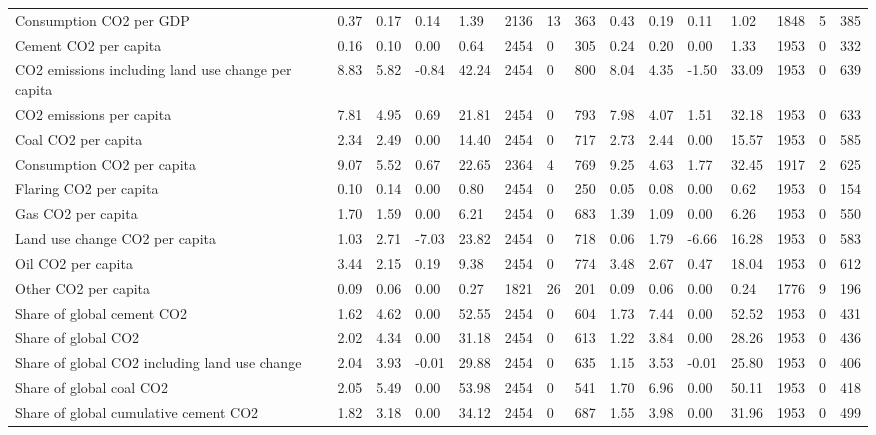 \begin{longtable}{lllllllllllllll}
\addlinespace
Consumption CO2 per GDP & 0.37 & 0.17 & 0.14 & 1.39 & 2136 & 13 & 363 & 0.43 & 0.19 & 0.11 & 1.02 & 1848 & 5 & 385\\
Cement CO2 per capita & 0.16 & 0.10 & 0.00 & 0.64 & 2454 & 0 & 305 & 0.24 & 0.20 & 0.00 & 1.33 & 1953 & 0 & 332\\
CO2 emissions including land use change per capita & 8.83 & 5.82 & -0.84 & 42.24 & 2454 & 0 & 800 & 8.04 & 4.35 & -1.50 & 33.09 & 1953 & 0 & 639\\
CO2 emissions per capita & 7.81 & 4.95 & 0.69 & 21.81 & 2454 & 0 & 793 & 7.98 & 4.07 & 1.51 & 32.18 & 1953 & 0 & 633\\
Coal CO2 per capita & 2.34 & 2.49 & 0.00 & 14.40 & 2454 & 0 & 717 & 2.73 & 2.44 & 0.00 & 15.57 & 1953 & 0 & 585\\
\addlinespace
Consumption CO2 per capita & 9.07 & 5.52 & 0.67 & 22.65 & 2364 & 4 & 769 & 9.25 & 4.63 & 1.77 & 32.45 & 1917 & 2 & 625\\
Flaring CO2 per capita & 0.10 & 0.14 & 0.00 & 0.80 & 2454 & 0 & 250 & 0.05 & 0.08 & 0.00 & 0.62 & 1953 & 0 & 154\\
Gas CO2 per capita & 1.70 & 1.59 & 0.00 & 6.21 & 2454 & 0 & 683 & 1.39 & 1.09 & 0.00 & 6.26 & 1953 & 0 & 550\\
Land use change CO2 per capita & 1.03 & 2.71 & -7.03 & 23.82 & 2454 & 0 & 718 & 0.06 & 1.79 & -6.66 & 16.28 & 1953 & 0 & 583\\
Oil CO2 per capita & 3.44 & 2.15 & 0.19 & 9.38 & 2454 & 0 & 774 & 3.48 & 2.67 & 0.47 & 18.04 & 1953 & 0 & 612\\
\addlinespace
Other CO2 per capita & 0.09 & 0.06 & 0.00 & 0.27 & 1821 & 26 & 201 & 0.09 & 0.06 & 0.00 & 0.24 & 1776 & 9 & 196\\
Share of global cement CO2 & 1.62 & 4.62 & 0.00 & 52.55 & 2454 & 0 & 604 & 1.73 & 7.44 & 0.00 & 52.52 & 1953 & 0 & 431\\
Share of global CO2 & 2.02 & 4.34 & 0.00 & 31.18 & 2454 & 0 & 613 & 1.22 & 3.84 & 0.00 & 28.26 & 1953 & 0 & 436\\
Share of global CO2 including land use change & 2.04 & 3.93 & -0.01 & 29.88 & 2454 & 0 & 635 & 1.15 & 3.53 & -0.01 & 25.80 & 1953 & 0 & 406\\
Share of global coal CO2 & 2.05 & 5.49 & 0.00 & 53.98 & 2454 & 0 & 541 & 1.70 & 6.96 & 0.00 & 50.11 & 1953 & 0 & 418\\
\addlinespace
Share of global cumulative cement CO2 & 1.82 & 3.18 & 0.00 & 34.12 & 2454 & 0 & 687 & 1.55 & 3.98 & 0.00 & 31.96 & 1953 & 0 & 499\\

\end{longtable}
